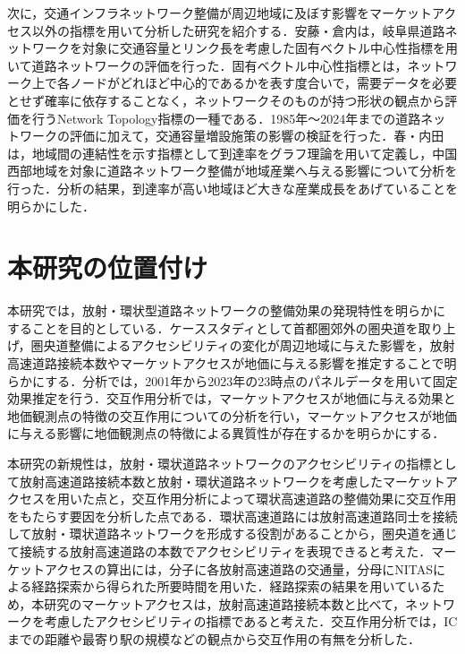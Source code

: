 次に，交通インフラネットワーク整備が周辺地域に及ぼす影響をマーケットアクセス以外の指標を用いて分析した研究を紹介する．安藤・倉内\cite{kurauchi2020}は，岐阜県道路ネットワークを対象に交通容量とリンク長を考慮した固有ベクトル中心性指標を用いて道路ネットワークの評価を行った．固有ベクトル中心性指標とは，ネットワーク上で各ノードがどれほど中心的であるかを表す度合いで，需要データを必要とせず確率に依存することなく，ネットワークそのものが持つ形状の観点から評価を行うNetwork Topology指標の一種である．1985年〜2024年までの道路ネットワークの評価に加えて，交通容量増設施策の影響の検証を行った．春・内田\cite{haru2011}は，地域間の連結性を示す指標として到達率をグラフ理論を用いて定義し，中国西部地域を対象に道路ネットワーク整備が地域産業へ与える影響について分析を行った．分析の結果，到達率が高い地域ほど大きな産業成長をあげていることを明らかにした．

\section{本研究の位置付け}
本研究では，放射・環状型道路ネットワークの整備効果の発現特性を明らかにすることを目的としている．ケーススタディとして首都圏郊外の圏央道を取り上げ，圏央道整備によるアクセシビリティの変化が周辺地域に与えた影響を，放射高速道路接続本数やマーケットアクセスが地価に与える影響を推定することで明らかにする．分析では，2001年から2023年の23時点のパネルデータを用いて固定効果推定を行う．交互作用分析では，マーケットアクセスが地価に与える効果と地価観測点の特徴の交互作用についての分析を行い，マーケットアクセスが地価に与える影響に地価観測点の特徴による異質性が存在するかを明らかにする．

本研究の新規性は，放射・環状道路ネットワークのアクセシビリティの指標として放射高速道路接続本数と放射・環状道路ネットワークを考慮したマーケットアクセスを用いた点と，交互作用分析によって環状高速道路の整備効果に交互作用をもたらす要因を分析した点である．環状高速道路には放射高速道路同士を接続して放射・環状道路ネットワークを形成する役割があることから，圏央道を通じて接続する放射高速道路の本数でアクセシビリティを表現できると考えた．マーケットアクセスの算出には，分子に各放射高速道路の交通量，分母にNITASによる経路探索から得られた所要時間を用いた．経路探索の結果を用いているため，本研究のマーケットアクセスは，放射高速道路接続本数と比べて，ネットワークを考慮したアクセシビリティの指標であると考えた．交互作用分析では，ICまでの距離や最寄り駅の規模などの観点から交互作用の有無を分析した．

